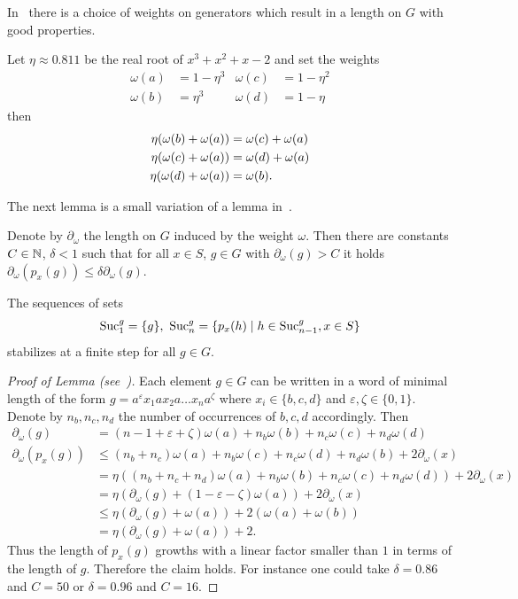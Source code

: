 \documentclass[a4paper,11pt]{amsart}
\begin{document}
In~\cite{Bartholdi:Growth} there is a choice of weights on generators which result in a length on $G$ with good properties.
\begin{lem} \label{lem:laurentsweights}\pushQED{\qed}
 Let $\eta\approx 0.811$ be the real root of $x^3+x^2+x-2$ and set the weights 
 \begin{align*}
  \omega(a) &= 1-\eta^3 & \omega(c)&=1-\eta^2 \\ \omega(b)&= \eta^3 & \omega(d)&=1-\eta
 \end{align*}
 then 
 \begin{align*}
  \eta(\omega(b)+\omega(a)) &= \omega(c)+\omega(a) \\
  \eta(\omega(c)+\omega(a)) &= \omega(d)+\omega(a) \\
  \eta(\omega(d)+\omega(a)) &= \omega(b).\qedhere
 \end{align*}
\end{lem}
The next lemma is a small variation of a lemma in~\cite{Bartholdi:Growth}.
\begin{lem}
 Denote by $\partial_\omega$ the length on $G$ induced by the weight $\omega$. Then
 there are constants $C\in\mathbb{N}$, $\delta<1$ such that for all $x\in S$, $g\in G$ 
 with $\partial_\omega(g)>C$ it holds 
 $\partial_\omega(p_x(g)) \leq \delta \partial_\omega(g)$.
\end{lem}
\begin{cor}
The sequences of sets
 \[\textup{Suc}_1^g=\{g\},\ \textup{Suc}_n^g = \{p_x(h) \mid h\in \textup{Suc}_{n-1}^g, x\in S\} \]
 stabilizes at a finite step for all $g\in G$.
\end{cor}
\begin{proof}[Proof of Lemma (see~{\cite[Proposition~5]{Bartholdi:Growth}})] 
 Each element $g\in G$ can be written in a word of minimal length of the form $g=a^\varepsilon x_1 a x_2 a\ldots x_n a^\zeta$ where
 $x_i\in \{b,c,d\}$ and $\varepsilon,\zeta\in \{0,1\}$. Denote by $n_b,n_c,n_d$ the number of occurrences of $b,c,d$ accordingly. 
 Then
 \begin{align*}
  \partial_\omega(g) &= (n-1+\varepsilon+\zeta)\omega(a)+n_b\omega(b)+n_c\omega(c)+n_d\omega(d)\\
  \partial_\omega(p_x(g)) &\leq (n_b+n_c)\omega(a)+n_b\omega(c)+n_c\omega(d)+n_d\omega(b) + 2\partial_\omega(x)\\
  &= \eta\left( (n_b+n_c+n_d)\omega(a)+n_b\omega(b)+n_c\omega(c)+n_d\omega(d) \right) + 2\partial_\omega(x)\\
  &= \eta(\partial_\omega(g) +(1-\varepsilon-\zeta)\omega(a)) + 2\partial_\omega(x) \\
  &\leq \eta(\partial_\omega(g)+\omega(a)) + 2(\omega(a)+\omega(b))\\
  &= \eta(\partial_\omega(g)+\omega(a)) + 2.
 \end{align*}
 Thus the length of $p_x(g)$ growths with a linear factor smaller than $1$ in terms of the length of $g$. Therefore the claim holds.
 For instance one could take $\delta =0.86$ and $C=50$ or $\delta=0.96$ and $C=16$.
\end{proof}
\end{document}
